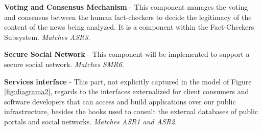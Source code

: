 \noindent\textbf{Voting and Consensus Mechanism} - This component manages the voting and consensus between the human fact-checkers to decide the legitimacy of the content of the news being analyzed. It is a component within the Fact-Checkers Subsystem. \textit{Matches ASR3}.

\noindent\textbf{Secure Social Network} - This component will be implemented to support a secure social network. \textit{Matches SMR6}.





\noindent\textbf{Services interface} - This part, not explicitly captured in the model of Figure  \ref{fig:diagrama2}, regards to the interfaces externalized for client consumers and software developers that can access and build applications over our public infrastructure, besides the hooks used to consult the external databases of public portals and social networks. \textit{Matches ASR1 and ASR2}.

